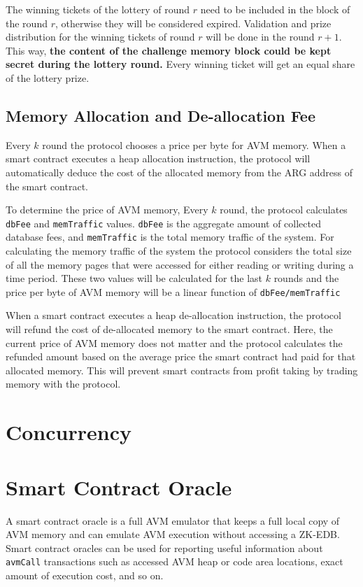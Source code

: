 The winning tickets of the lottery of round \(r\) need to be included in the block of the round \(r\),
otherwise they will be considered expired. Validation and prize distribution for the winning tickets of round
\(r\) will be done in the round \(r + 1\). This way, \textbf{the content of the challenge memory block could be
kept secret during the lottery round.} Every winning ticket will get an equal share of the lottery prize.

\subsection{Memory Allocation and De-allocation Fee}\label{subsec:memory-allocation-and-de-allocation}

Every \(k\) round the protocol chooses a price per byte for AVM memory. When a smart contract executes a heap
allocation instruction, the protocol will automatically deduce the cost of the allocated memory from the ARG
address of the smart contract.

To determine the price of AVM memory, Every \(k\) round, the protocol calculates \texttt{dbFee} and
\texttt{memTraffic} values. \texttt{dbFee} is the aggregate amount of collected database fees, and
\texttt{memTraffic} is the total memory traffic of the system. For calculating the memory traffic of the system
the protocol considers the total size of all the memory pages that were accessed for either reading or writing
during a time period. These two values will be calculated for the last \(k\) rounds and the price per byte of
AVM memory will be a linear function of \texttt{dbFee/memTraffic}

When a smart contract executes a heap de-allocation instruction, the protocol will refund the cost of
de-allocated memory to the smart contract. Here, the current price of AVM memory does not matter and the protocol
calculates the refunded amount based on the average price the smart contract had paid for that allocated memory.
This will prevent smart contracts from profit taking by trading memory with the protocol.


\section{Concurrency}\label{sec:concurrency}



\section{Smart Contract Oracle}\label{sec:smart-contract-oracle}

A smart contract oracle is a full AVM emulator that keeps a full local copy of AVM memory and can emulate AVM
execution without accessing a ZK-EDB. Smart contract oracles can be used for reporting useful information about
\texttt{avmCall} transactions such as accessed AVM heap or code area locations, exact amount of execution cost,
and so on.